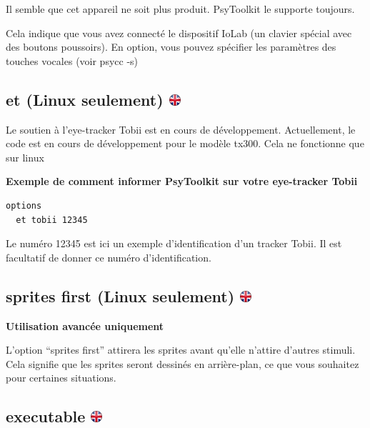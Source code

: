 \documentclass[
]{book}
\begin{document}
Il semble que cet appareil ne soit plus produit. PsyToolkit le supporte
toujours.

Cela indique que vous avez connecté le dispositif IoLab (un clavier
spécial avec des boutons poussoirs). En option, vous pouvez spécifier
les paramètres des touches vocales (voir psycc -s)

\hypertarget{et-linux-seulement}{%
\subsection[et (Linux seulement) ]{\texorpdfstring{et (Linux seulement)
\href{https://www.psytoolkit.org/doc3.2.0/syntax.html\#options-et}{\protect\includegraphics{img/ukflag.png}}}{et (Linux seulement) }}\label{et-linux-seulement}}

Le soutien à l'eye-tracker Tobii est en cours de développement.
Actuellement, le code est en cours de développement pour le modèle
tx300. Cela ne fonctionne que sur linux

\textbf{Exemple de comment informer PsyToolkit sur votre eye-tracker
Tobii}

\begin{verbatim}
options
  et tobii 12345
\end{verbatim}

Le numéro 12345 est ici un exemple d'identification d'un tracker Tobii.
Il est facultatif de donner ce numéro d'identification.

\hypertarget{sprites-first-linux-seulement}{%
\subsection[sprites first (Linux seulement) ]{\texorpdfstring{sprites
first (Linux seulement)
\href{https://www.psytoolkit.org/doc3.2.0/syntax.html\#options-sprites-first}{\protect\includegraphics{img/ukflag.png}}}{sprites first (Linux seulement) }}\label{sprites-first-linux-seulement}}

\textbf{Utilisation avancée uniquement}

L'option ``sprites first'' attirera les sprites avant qu'elle n'attire
d'autres stimuli. Cela signifie que les sprites seront dessinés en
arrière-plan, ce que vous souhaitez pour certaines situations.

\hypertarget{executable}{%
\subsection[executable ]{\texorpdfstring{executable
\href{https://www.psytoolkit.org/doc3.2.0/syntax.html\#options-executable}{\protect\includegraphics{img/ukflag.png}}}{executable }}\label{executable}}
\end{document}
